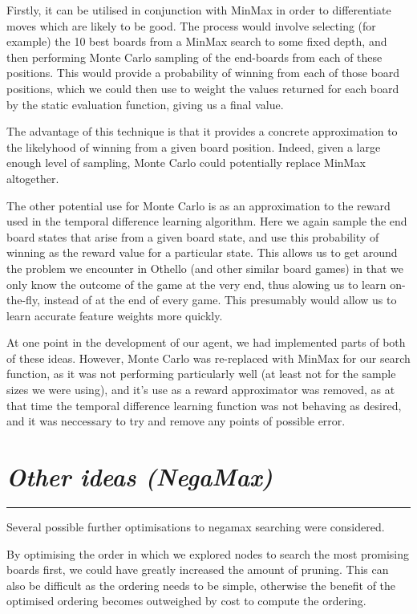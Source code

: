 \documentclass[10pt]{report}
\begin{document}
\begin{multicols}{2}
Firstly, it can be utilised in conjunction with MinMax in order to differentiate moves which are likely to be good. The process would involve selecting (for example) the 10 best boards from a MinMax search to some fixed depth, and then performing Monte Carlo sampling of the end-boards from each of these positions. This would provide a probability of winning from each of those board positions, which we could then use to weight the values returned for each board by the static evaluation function, giving us a final value.

The advantage of this technique is that it provides a concrete approximation to the likelyhood of winning from a given board position. Indeed, given a large enough level of sampling, Monte Carlo could potentially replace MinMax altogether.

The other potential use for Monte Carlo is as an approximation to the reward used in the temporal difference learning algorithm. Here we again sample the end board states that arise from a given board state, and use this probability of winning as the reward value for a particular state. This allows us to get around the problem we encounter in Othello (and other similar board games) in that we only know the outcome of the game at the very end, thus alowing us to learn on-the-fly, instead of at the end of every game. This presumably would allow us to learn accurate feature weights more quickly.

At one point in the development of our agent, we had implemented parts of both of these ideas. However, Monte Carlo was re-replaced with MinMax for our search function, as it was not performing particularly well (at least not for the sample sizes we were using), and it's use as a reward approximator was removed, as at that time the temporal difference learning function was not behaving as desired, and it was neccessary to try and remove any points of possible error.

\section*{\emph{Other ideas (NegaMax)}}
\hrule

Several possible further optimisations to negamax searching were considered.

By optimising the order in which we explored nodes to search the most promising boards first, we could have greatly increased the amount of pruning. This can also be difficult as the ordering needs to be simple, otherwise the benefit of the optimised ordering becomes outweighed by cost to compute the ordering.


\end{multicols}
\end{document}
